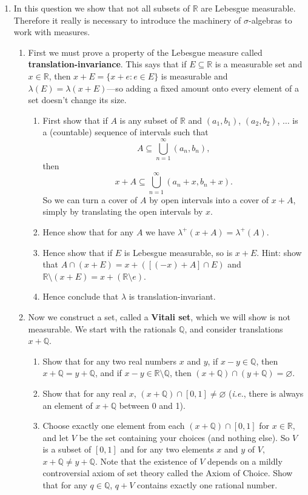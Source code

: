 \documentclass{article}
\let\take\setminus
\begin{document}
\begin{enumerate}
\begin{enumerate}
\begin{enumerate}
				\end{enumerate}
		\end{enumerate}
	\item In this question we show that not all subsets of $\mathbb{R}$ are Lebesgue measurable. Therefore it really is necessary to introduce the machinery of $\sigma$-algebras to work with measures.
		\begin{enumerate}
			\item First we must prove a property of the Lebesgue measure called \textbf{translation-invariance}. This says that if $E\subseteq \mathbb{R}$ is a measurable set and $x\in\mathbb{R}$, then $x+E=\{x+e : e\in E\}$ is measurable and $\lambda(E)=\lambda(x+E)$---so adding a fixed amount onto every element of a set doesn't change its size.
				\begin{enumerate}
					\item First show that if $A$ is any subset of $\mathbb{R}$ and $(a_1,b_1)$, $(a_2,b_2)$, $\hdots$ is a (countable) sequence of intervals such that
						\[A\subseteq \bigcup_{n=1}^\infty (a_n,b_n),\]
						then
						\[x+A\subseteq \bigcup_{n=1}^\infty (a_n+x,b_n+x).\]
						So we can turn a cover of $A$ by open intervals into a cover of $x+A$, simply by translating the open intervals by $x$.
					\item Hence show that for any $A$ we have $\lambda^+(x+A)=\lambda^+(A)$.
					\item Hence show that if $E$ is Lebesgue measurable, so is $x+E$. Hint: show that $A\cap(x+E)=x+([(-x)+A]\cap E)$ and $\mathbb{R}\take(x+E)=x+(\mathbb{R}\take e)$.
					\item Hence conclude that $\lambda$ is translation-invariant.
				\end{enumerate}
			\item Now we construct a set, called a \textbf{Vitali set}, which we will show is not measurable. We start with the rationals $\mathbb{Q}$, and consider translations $x+\mathbb{Q}$.
				\begin{enumerate}
					\item Show that for any two real numbers $x$ and $y$, if $x-y\in \mathbb{Q}$, then $x+\mathbb{Q}=y+\mathbb{Q}$, and if $x-y\in\mathbb{R}\take\mathbb{Q}$, then $(x+\mathbb{Q})\cap(y+\mathbb{Q})=\varnothing$.
					\item Show that for any real $x$, $(x+\mathbb{Q})\cap [0,1]\neq \varnothing$ (\textit{i.e.}, there is always an element of $x+\mathbb{Q}$ between 0 and 1).
					\item Choose exactly one element from each $(x+\mathbb{Q})\cap[0,1]$ for $x\in\mathbb{R}$, and let $V$ be the set containing your choices (and nothing else). So $V$ is a subset of $[0,1]$ and for any two elements $x$ and $y$ of $V$, $x+\mathbb{Q}\neq y+\mathbb{Q}$. Note that the existence of $V$ depends on a mildly controversial axiom of set theory called the Axiom of Choice. Show that for any $q\in\mathbb{Q}$, $q+V$ contains exactly one rational number.

\end{enumerate}
\end{enumerate}
\end{enumerate}
\end{document}
